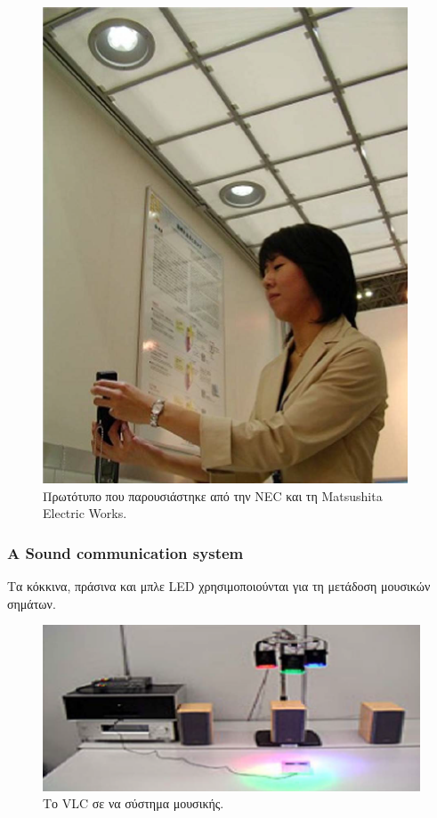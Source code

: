 \documentclass[conference]{IEEEtran}
\begin{document}
\begin{figure}[h]
  \includegraphics[width=\linewidth]{5.png}
  \caption{Πρωτότυπο που παρουσιάστηκε από την NEC και τη Matsushita Electric Works.} 
\end{figure}


\subsubsection{A Sound communication system}
Τα κόκκινα, πράσινα και μπλε LED χρησιμοποιούνται για τη μετάδοση μουσικών σημάτων.

\begin{figure}[h]
  \includegraphics[width=\linewidth]{6.png}
  \caption{Το VLC σε να σύστημα μουσικής.} 
\end{figure}
\end{document}
